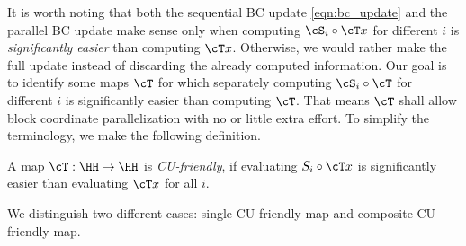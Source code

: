 It is worth noting that both the sequential BC update \eqref{eqn:bc_update} and the parallel BC update make sense only when computing $\cS_i \circ \cT x$ for different $i$ is \emph{significantly easier} than computing $\cT x$. Otherwise, we would rather make the full update instead of discarding the already computed information. Our goal is to identify some maps $\cT$ for which separately computing $\cS_i \circ \cT$ for different $i$ is significantly easier than computing $\cT$. That means $\cT$ shall allow block coordinate parallelization with no or little extra effort. To simplify the terminology, we make the following definition.
\begin{definition}
A map $\cT: \HH \rightarrow \HH$ is \emph{CU-friendly}, if evaluating $S_i \circ \cT x$ is significantly easier than evaluating $\cT x$ for all $i$.
\end{definition}

We distinguish two different cases: single CU-friendly map and composite CU-friendly map.
